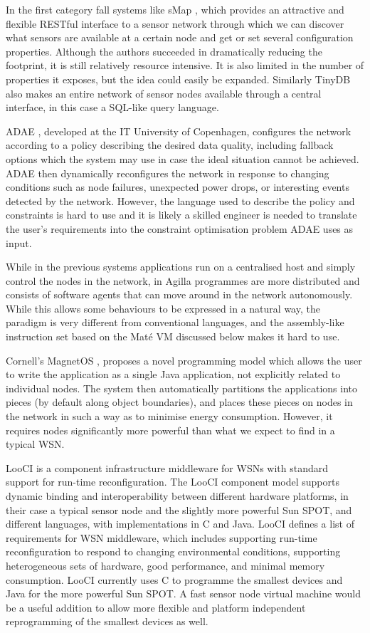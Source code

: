 In the first category fall systems like sMap \cite{DawsonHaggerty:2010eo}, which provides an attractive and flexible RESTful interface to a sensor network through which we can discover what sensors are available at a certain node and get or set several configuration properties. Although the authors succeeded in dramatically reducing the footprint, it is still relatively resource intensive. It is also limited in the number of properties it exposes, but the idea could easily be expanded. Similarly TinyDB \cite{Madden:2005tj} also makes an entire network of sensor nodes available through a central interface, in this case a SQL-like query language.

ADAE \cite{Chang:2010ek}, developed at the IT University of Copenhagen, configures the network according to a policy describing the desired data quality, including fallback options which the system may use in case the ideal situation cannot be achieved. ADAE then dynamically reconfigures the network in response to changing conditions such as node failures, unexpected power drops, or interesting events detected by the network. However, the language used to describe the policy and constraints is hard to use and it is likely a skilled engineer is needed to translate the user's requirements into the constraint optimisation problem ADAE uses as input.

While in the previous systems applications run on a centralised host and simply control the nodes in the network, in Agilla \cite{Fok:2005bh} programmes are more distributed and consists of software agents that can move around in the network autonomously. While this allows some behaviours to be expressed in a natural way, the paradigm is very different from conventional languages, and the assembly-like instruction set based on the Maté VM \cite{Levis:2002ku} discussed below makes it hard to use.

Cornell's MagnetOS \cite{Liu:2005wsa}, proposes a novel programming model which allows the user to write the application as a single Java application, not explicitly related to individual nodes. The system then automatically partitions the applications into pieces (by default along object boundaries), and places these pieces on nodes in the network in such a way as to minimise energy consumption. However, it requires nodes significantly more powerful than what we expect to find in a typical WSN.

LooCI \cite{Hughes:dg} is a component infrastructure middleware for WSNs with standard support for run-time reconfiguration. The LooCI component model supports dynamic binding and interoperability between different hardware platforms, in their case a typical sensor node and the slightly more powerful Sun SPOT, and different languages, with implementations in C and Java. LooCI defines a list of requirements for WSN middleware, which includes supporting run-time reconfiguration to respond to changing environmental conditions, supporting heterogeneous sets of hardware, good performance, and minimal memory consumption. LooCI currently uses C to programme the smallest devices and Java for the more powerful Sun SPOT. A fast sensor node virtual machine would be a useful addition to allow more flexible and platform independent reprogramming of the smallest devices as well.

